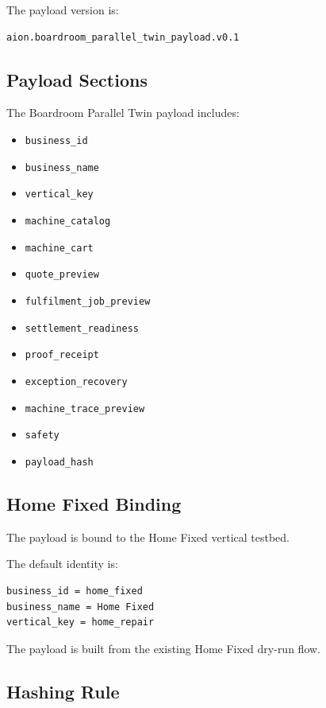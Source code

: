 The payload version is:

\begin{verbatim}
aion.boardroom_parallel_twin_payload.v0.1
\end{verbatim}

\subsection{Payload Sections}

The Boardroom Parallel Twin payload includes:

\begin{itemize}
  \item \texttt{business\_id}
  \item \texttt{business\_name}
  \item \texttt{vertical\_key}
  \item \texttt{machine\_catalog}
  \item \texttt{machine\_cart}
  \item \texttt{quote\_preview}
  \item \texttt{fulfilment\_job\_preview}
  \item \texttt{settlement\_readiness}
  \item \texttt{proof\_receipt}
  \item \texttt{exception\_recovery}
  \item \texttt{machine\_trace\_preview}
  \item \texttt{safety}
  \item \texttt{payload\_hash}
\end{itemize}

\subsection{Home Fixed Binding}

The payload is bound to the Home Fixed vertical testbed.

The default identity is:

\begin{verbatim}
business_id = home_fixed
business_name = Home Fixed
vertical_key = home_repair
\end{verbatim}

The payload is built from the existing Home Fixed dry-run flow.

\subsection{Hashing Rule}

